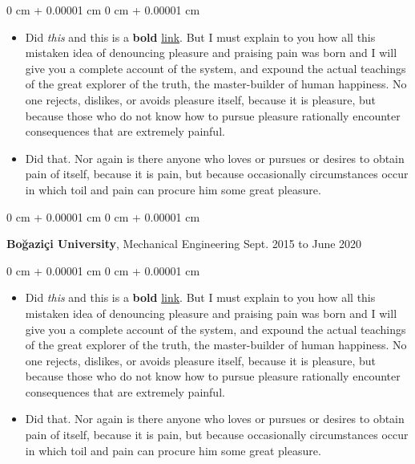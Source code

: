 \documentclass[10pt, letterpaper]{article}
\newenvironment{highlights}{
    \begin{itemize}[
        topsep=0.10 cm,
        parsep=0.10 cm,
        partopsep=0pt,
        itemsep=0pt,
        leftmargin=0 cm + 10pt
    ]
}{
    \end{itemize}
} %
\newenvironment{onecolentry}{
    \begin{adjustwidth}{
        0 cm + 0.00001 cm
    }{
        0 cm + 0.00001 cm
    }
}{
    \end{adjustwidth}
} %
\newenvironment{twocolentry}[2][]{
    \onecolentry
    \def\secondColumn{#2}
    \setcolumnwidth{\fill, 4.5 cm}
    \begin{paracol}{2}
}{
    \switchcolumn \raggedleft \secondColumn
    \end{paracol}
    \endonecolentry
} %
\begin{document}
        \vspace{0.10 cm}
        \begin{onecolentry}
            \begin{highlights}
                \item Did \textit{this} and this is a \textbf{bold} \href{https://example.com}{link}. But I must explain to you how all this mistaken idea of denouncing pleasure and praising pain was born and I will give you a complete account of the system, and expound the actual teachings of the great explorer of the truth, the master-builder of human happiness. No one rejects, dislikes, or avoids pleasure itself, because it is pleasure, but because those who do not know how to pursue pleasure rationally encounter consequences that are extremely painful.
                \item Did that. Nor again is there anyone who loves or pursues or desires to obtain pain of itself, because it is pain, but because occasionally circumstances occur in which toil and pain can procure him some great pleasure.
            \end{highlights}
        \end{onecolentry}


        \vspace{0.2 cm}

        \begin{twocolentry}{
            Sept. 2015 to June 2020
        }
            \textbf{Boğaziçi University}, Mechanical Engineering\end{twocolentry}

        \vspace{0.10 cm}
        \begin{onecolentry}
            \begin{highlights}
                \item Did \textit{this} and this is a \textbf{bold} \href{https://example.com}{link}. But I must explain to you how all this mistaken idea of denouncing pleasure and praising pain was born and I will give you a complete account of the system, and expound the actual teachings of the great explorer of the truth, the master-builder of human happiness. No one rejects, dislikes, or avoids pleasure itself, because it is pleasure, but because those who do not know how to pursue pleasure rationally encounter consequences that are extremely painful.
                \item Did that. Nor again is there anyone who loves or pursues or desires to obtain pain of itself, because it is pain, but because occasionally circumstances occur in which toil and pain can procure him some great pleasure.
            \end{highlights}
        \end{onecolentry}
\end{document}
